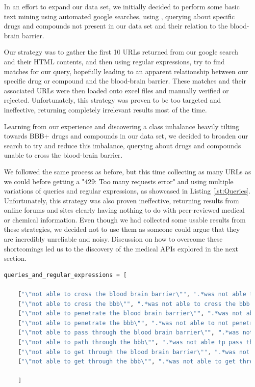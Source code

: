 In an effort to expand our data set, we initially decided to perform some basic text mining using automated google searches, using \citet{Google_Package}, querying about specific drugs and compounds not present in our data set and their relation to the blood-brain barrier.

Our strategy was to gather the first 10 URLs returned from our google search and their HTML contents, and then using regular expressions, try to find matches for our query, hopefully leading to an apparent relationship between our specific drug or compound and the blood-brain barrier. These matches and their associated URLs were then loaded onto excel files and manually verified or rejected. Unfortunately, this strategy was proven to be too targeted and ineffective, returning completely irrelevant results most of the time.

Learning from our experience and discovering a class imbalance heavily tilting towards BBB+ drugs and compounds in our data set, we decided to broaden our search to try and reduce this imbalance, querying about drugs and compounds unable to cross the blood-brain barrier.

We followed the same process as before, but this time collecting as many URLs as we could before getting a "429: Too many requests error" and using multiple variations of queries and regular expressions, as showcased in Listing \ref{lst:Queries}. Unfortunately, this strategy was also proven ineffective, returning results from online forums and sites clearly having nothing to do with peer-reviewed medical or chemical information. 
Even though we had collected some usable results from these strategies, we decided not to use them as someone could argue that they are incredibly unreliable and noisy. Discussion on how to overcome these shortcomings led us to the discovery of the medical APIs explored in the next section.

\begin{lstlisting}[language=python, label={lst:Queries}, caption={A small sample of the list of queries and regular expressions used in an effort to expand our data set using Google Searches.}]
    queries_and_regular_expressions = [

    ["\"not able to cross the blood brain barrier\"", ".*was not able to cross the blood.brain barrier.*"],
    ["\"not able to cross the bbb\"", ".*was not able to cross the bbb.*"],
    ["\"not able to penetrate the blood brain barrier\"", ".*was not able to penetrate the blood.brain barrier.*"],
    ["\"not able to penetrate the bbb\"", ".*was not able to not penetrate the bbb.*"],
    ["\"not able to pass through the blood brain barrier\"", ".*was not able to pass through the blood.brain barrier.*"],
    ["\"not able to path through the bbb\"", ".*was not able tp pass through the bbb.*"],
    ["\"not able to get through the blood brain barrier\"", ".*was not able to get through the blood.brain barrier.*"],
    ["\"not able to get through the bbb\"", ".*was not able to get through the bbb.*"]
    
    ]
\end{lstlisting}

